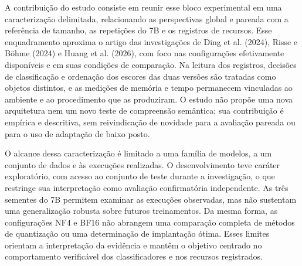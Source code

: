 \documentclass[12pt,a4paper]{article}
\begin{document}
A contribuição do estudo consiste em reunir esse bloco experimental em uma caracterização delimitada, relacionando as perspectivas global e pareada com a referência de tamanho, as repetições do 7B e os registros de recursos. Esse enquadramento aproxima o artigo das investigações de Ding et al. (2024), Risse e Böhme (2024) e Huang et al. (2026), com foco nas configurações efetivamente disponíveis e em suas condições de comparação. Na leitura dos registros, decisões de classificação e ordenação dos escores das duas versões são tratadas como objetos distintos, e as medições de memória e tempo permanecem vinculadas ao ambiente e ao procedimento que as produziram. O estudo não propõe uma nova arquitetura nem um novo teste de compreensão semântica; sua contribuição é empírica e descritiva, sem reivindicação de novidade para a avaliação pareada ou para o uso de adaptação de baixo posto.

O alcance dessa caracterização é limitado a uma família de modelos, a um conjunto de dados e às execuções realizadas. O desenvolvimento teve caráter exploratório, com acesso ao conjunto de teste durante a investigação, o que restringe sua interpretação como avaliação confirmatória independente. As três sementes do 7B permitem examinar as execuções observadas, mas não sustentam uma generalização robusta sobre futuros treinamentos. Da mesma forma, as configurações NF4 e BF16 não abrangem uma comparação completa de métodos de quantização ou uma determinação de implantação ótima. Esses limites orientam a interpretação da evidência e mantêm o objetivo centrado no comportamento verificável dos classificadores e nos recursos registrados.

\nocite{ding2024primevul,risse2024limits,huang2026trap,hui2024qwen,hu2021lora,dettmers2023qlora}
\end{document}
